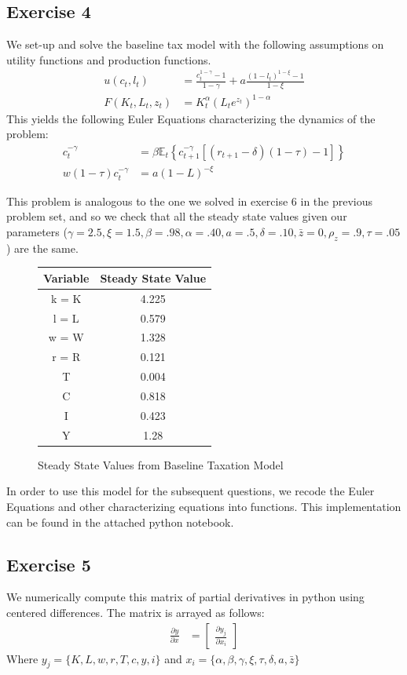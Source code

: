 \documentclass{article}
\begin{document}
	\subsection*{Exercise 4}
	We set-up and solve the baseline tax model with the following assumptions on utility functions and production functions.
	\begin{align*}
	u(c_t, l_t) &= \frac{c_t^{1-\gamma} - 1}{1 - \gamma} + a \frac{(1 -l_t)^{1 - \xi} -1}{1 -\xi} \\
	F(K_t, L_t, z_t) &= K_t^{\alpha}(L_t e^{z_t})^{1-\alpha} 
	\end{align*}
	This yields the following Euler Equations characterizing the dynamics of the problem:
	\begin{align*}
	c_t^{-\gamma} &= \beta \mathbb{E}_t \left\{ c_{t+1}^{-\gamma}[(r_{t+1} - \delta)(1-\tau) - 1]\right\} \\
	w(1-\tau)c_t^{-\gamma} &= a(1-L)^{-\xi} 
    \end{align*}
    
    This problem is analogous to the one we solved in exercise 6 in the previous problem set, and so we check that all the steady state values given our parameters ($\gamma = 2.5, \xi = 1.5, \beta = .98, \alpha = .40, a = .5, \delta = .10, \bar{z} = 0, \rho_z = .9, \tau = .05$) are the same.
    \begin{figure}[!h]
    	\centering
    	\caption{Steady State Values from Baseline Taxation Model}
    	\begin{tabular}{c | c}
    		Variable & Steady State Value\\
    		\hline
    		k = K & 4.225\\
    		l = L& 0.579\\
    		w = W & 1.328 \\
    		r = R & 0.121 \\
    		T & 0.004 \\
    		C & 0.818 \\
    		I & 0.423 \\
    		Y & 1.28  \\
    		\hline
    	\end{tabular}
    \end{figure}
    
    In order to use this model for the subsequent questions, we recode the Euler Equations and other characterizing equations into functions. This implementation can be found in the attached python notebook.
    
    \subsection*{Exercise 5}
    We numerically compute this matrix of partial derivatives in python using centered differences. The matrix is arrayed as follows:
    \begin{align*}
    \frac{\partial y}{\partial x} &= \begin{bmatrix} \frac{\partial y_j}{\partial x_i}\end{bmatrix}
    \end{align*}
    Where $y_j = \{ K, L, w, r, T, c, y, i \}$ and $x_i = \{ \alpha, \beta, \gamma, \xi, \tau, \delta, a, \bar{z} \}$
    
\end{document}
